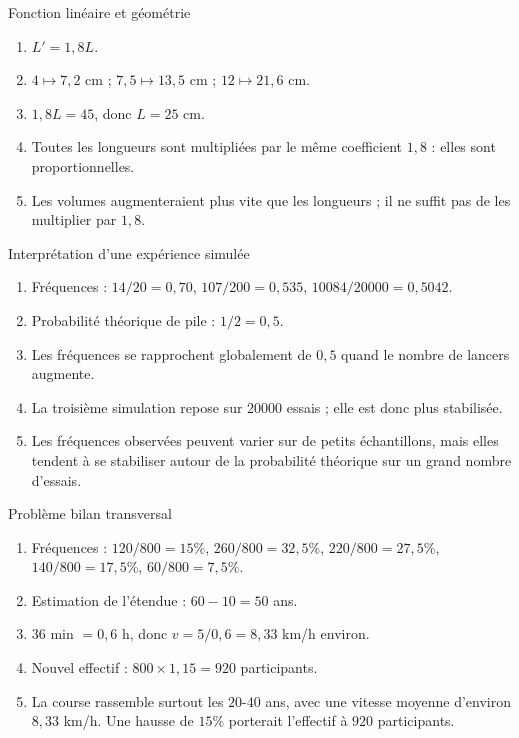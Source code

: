 \documentclass[11pt,a4paper]{article}
\newcounter{corr}
\begin{document}
\begin{corrbox}{Fonction linéaire et géométrie}
\begin{enumerate}
\item $L'=1{,}8L$.
\item $4\mapsto7{,}2$ cm ; $7{,}5\mapsto13{,}5$ cm ; $12\mapsto21{,}6$ cm.
\item $1{,}8L=45$, donc $L=25$ cm.
\item Toutes les longueurs sont multipliées par le même coefficient $1{,}8$ : elles sont proportionnelles.
\item Les volumes augmenteraient plus vite que les longueurs ; il ne suffit pas de les multiplier par $1{,}8$.
\end{enumerate}
\end{corrbox}

\begin{corrbox}{Interprétation d'une expérience simulée}
\begin{enumerate}
\item Fréquences : $14/20=0{,}70$, $107/200=0{,}535$, $10084/20000=0{,}5042$.
\item Probabilité théorique de pile : $1/2=0{,}5$.
\item Les fréquences se rapprochent globalement de $0{,}5$ quand le nombre de lancers augmente.
\item La troisième simulation repose sur $20000$ essais ; elle est donc plus stabilisée.
\item Les fréquences observées peuvent varier sur de petits échantillons, mais elles tendent à se stabiliser autour de la probabilité théorique sur un grand nombre d'essais.
\end{enumerate}
\end{corrbox}

\begin{corrbox}{Problème bilan transversal}
\begin{enumerate}
\item Fréquences : $120/800=15\%$, $260/800=32{,}5\%$, $220/800=27{,}5\%$, $140/800=17{,}5\%$, $60/800=7{,}5\%$.
\item Estimation de l'étendue : $60-10=50$ ans.
\item $36$ min $=0{,}6$ h, donc $v=5/0{,}6=8{,}33$ km/h environ.
\item Nouvel effectif : $800\times1{,}15=920$ participants.
\item La course rassemble surtout les $20$-$40$ ans, avec une vitesse moyenne d'environ $8{,}33$ km/h. Une hausse de $15\%$ porterait l'effectif à $920$ participants.
\end{enumerate}
\end{corrbox}
\end{document}
